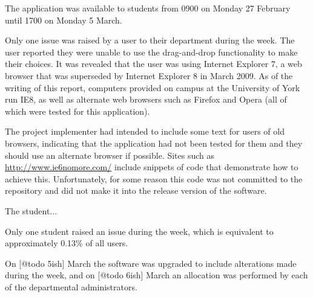 The application was available to students from 0900 on Monday 27 February
until 1700 on Monday 5 March. %




Only one issue was raised by a user to their department during the week. The
user reported they were unable to use the drag-and-drop functionality to make
their choices. It was revealed that the user was using Internet Explorer 7, a
web browser that was superseded by Internet Explorer 8 in March 2009. As of
the writing of this report, computers provided on campus at the University of
York run IE8, as well as alternate web browsers such as Firefox and Opera (all
of which were tested for this application).

The project implementer had intended to include some text for users of old
browsers, indicating that the application had not been tested for them and
they should use an alternate browser if possible. Sites such as
\url{http://www.ie6nomore.com/} include snippets of code that demonstrate how
to achieve this. Unfortunately, for some reason this code was not committed to
the repository and did not make it into the release version of the software.

The student... %

Only one student raised an issue during the week, which is equivalent to
approximately 0.13\% of all users.

On [@todo 5ish] March the software was upgraded to include alterations made
during the week, and on [@todo 6ish] March an allocation was performed by each
of the departmental administrators.

